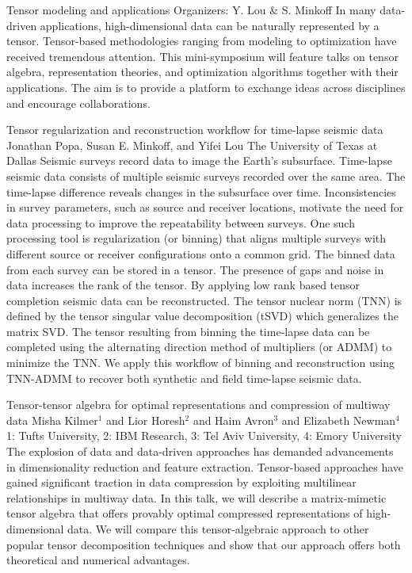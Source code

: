 \label{mini12}

\miniabs
{Tensor modeling and applications}
{Organizers: Y. Lou \& S. Minkoff}
{In many data-driven applications, high-dimensional data can be naturally represented by a tensor. Tensor-based methodologies ranging from modeling to optimization have received tremendous attention.  This mini-symposium will feature talks on tensor algebra, representation theories, and optimization algorithms together with their applications. The aim is to provide a platform to exchange ideas across disciplines and encourage collaborations.}

\vspace{2ex}
\abs
{Tensor regularization and reconstruction workflow for time-lapse seismic data}
{Jonathan Popa, Susan E. Minkoff, and Yifei Lou}
{The University of Texas at Dallas}
{Seismic surveys record data to image the Earth's subsurface. Time-lapse seismic data consists of multiple seismic surveys recorded over the same area. The time-lapse difference reveals changes in the subsurface over time. Inconsistencies in survey parameters, such as source and receiver locations, motivate the need for data processing to improve the repeatability between surveys. One such processing tool is regularization (or binning) that aligns multiple surveys with different source or receiver configurations onto a common grid. The binned data from each survey can be stored in a tensor. The presence of gaps and noise in data increases the rank of the tensor. By applying low rank based tensor completion seismic data can be reconstructed. The tensor nuclear norm (TNN) is defined by the tensor singular value decomposition (tSVD) which generalizes the matrix SVD. The tensor resulting from binning the time-lapse data can be completed using the alternating direction method of multipliers (or ADMM) to minimize the TNN. We apply this workflow of binning and reconstruction using TNN-ADMM to recover both synthetic and field time-lapse seismic data.}


\vspace{1.5ex}
\abs
{Tensor-tensor algebra for optimal representations and compression of multiway data} 
{Misha Kilmer$^{1}$ and Lior Horesh$^{2}$ and Haim Avron$^{3}$ and Elizabeth Newman$^{4}$}
{1: Tufts University, 2: IBM Research, 3: Tel Aviv University, 4: Emory University}
{The explosion of data and data-driven approaches has demanded advancements in dimensionality reduction and feature extraction.  Tensor-based approaches have gained significant traction in data compression by exploiting multilinear relationships in multiway data.  In this talk, we will describe a matrix-mimetic tensor algebra that offers provably optimal compressed representations of high-dimensional data.  We will compare this tensor-algebraic approach to other popular tensor decomposition techniques and show that our approach offers both theoretical and numerical advantages.}


